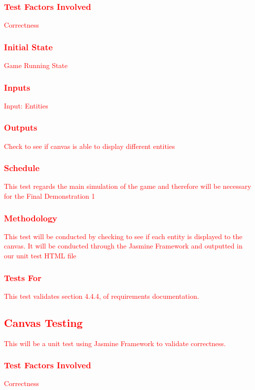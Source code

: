 \documentclass[11pt, oneside]{article}   	%
\begin{document}
\subsubsection{\textcolor{red}{Test Factors Involved}}
\textcolor{red}{Correctness}
\subsubsection{\textcolor{red}{Initial State}}
\textcolor{red}{Game Running State}
\subsubsection{\textcolor{red}{Inputs}}
\textcolor{red}{Input: Entities}
\subsubsection{\textcolor{red}{Outputs}}
\textcolor{red}{Check to see if canvas is able to display different entities}
\subsubsection{\textcolor{red}{Schedule}}
\textcolor{red}{This test regards the main simulation of the game and therefore will be necessary for the Final Demonstration 1}
\subsubsection{\textcolor{red}{Methodology}}
\textcolor{red}{This test will be conducted by checking to see if each entity is displayed to the canvas. It will be conducted through the Jasmine Framework and outputted in our unit test HTML file}
\subsubsection{\textcolor{red}{Tests For}}
\textcolor{red}{This test validates section 4.4.4, of requirements documentation.}


\subsection{\textcolor{red}{Canvas Testing}}
\textcolor{red}{This will be a unit test using Jasmine Framework to validate correctness.}
\subsubsection{\textcolor{red}{Test Factors Involved}}
\textcolor{red}{Correctness}
\end{document}
